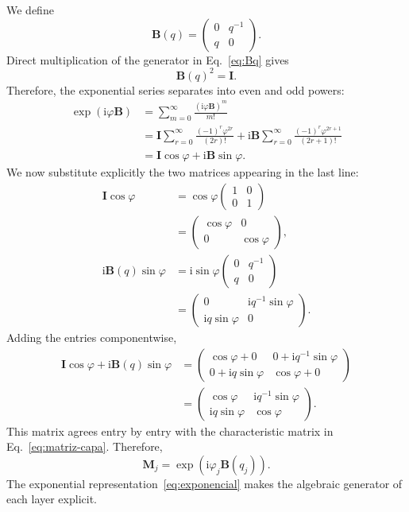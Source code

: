 \documentclass[10pt,a4paper]{article}
\newcommand{\ii}{\mathrm{i}}
\newcommand{\M}{\mathbf{M}}
\newcommand{\B}{\mathbf{B}}
\newcommand{\I}{\mathbf{I}}
\begin{document}
We define
\begin{equation}
\B(q)=
\begin{pmatrix}
0&q^{-1}\\
q&0
\end{pmatrix}.
\label{eq:Bq}
\end{equation}
Direct multiplication of the generator in Eq.~\eqref{eq:Bq} gives
\begin{equation}
\B(q)^2=\I.
\label{eq:B2}
\end{equation}
Therefore, the exponential series separates into even and odd powers:
\begin{align}
\exp\!\left(\ii\varphi\B\right)
&=\sum_{m=0}^{\infty}\frac{(\ii\varphi\B)^m}{m!}\\
&=\I\sum_{r=0}^{\infty}\frac{(-1)^r\varphi^{2r}}{(2r)!}
+\ii\B\sum_{r=0}^{\infty}\frac{(-1)^r\varphi^{2r+1}}{(2r+1)!}\\
&=\I\cos\varphi+\ii\B\sin\varphi.
\end{align}
We now substitute explicitly the two matrices appearing in the last line:
\begin{align*}
\I\cos\varphi
&=\cos\varphi
\begin{pmatrix}
1&0\\0&1
\end{pmatrix}
\nonumber\\
&=
\begin{pmatrix}
\cos\varphi&0\\0&\cos\varphi
\end{pmatrix},
\\[4pt]
\ii\B(q)\sin\varphi
&=\ii\sin\varphi
\begin{pmatrix}
0&q^{-1}\\q&0
\end{pmatrix}
\nonumber\\
&=
\begin{pmatrix}
0&\ii q^{-1}\sin\varphi\\
\ii q\sin\varphi&0
\end{pmatrix}.
\end{align*}
Adding the entries componentwise,
\begin{align*}
\I\cos\varphi+\ii\B(q)\sin\varphi
&=
\begin{pmatrix}
\cos\varphi+0&0+\ii q^{-1}\sin\varphi\\
0+\ii q\sin\varphi&\cos\varphi+0
\end{pmatrix}
\\[3pt]
&=
\begin{pmatrix}
\cos\varphi&\ii q^{-1}\sin\varphi\\
\ii q\sin\varphi&\cos\varphi
\end{pmatrix}.
\end{align*}
This matrix agrees entry by entry with the characteristic matrix in Eq.~\eqref{eq:matriz-capa}. Therefore,
\begin{equation}
\boxed{\M_j=\exp\!\left(\ii\varphi_j\B(q_j)\right).}
\label{eq:exponencial}
\end{equation}
The exponential representation~\eqref{eq:exponencial} makes the algebraic generator of each layer explicit.
\end{document}
